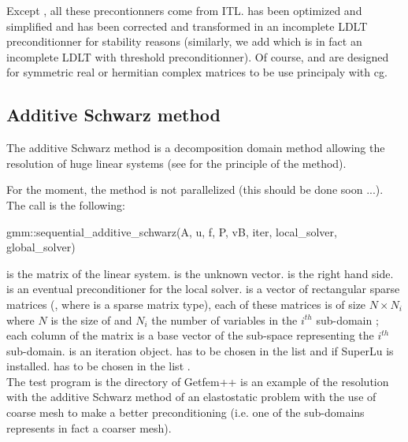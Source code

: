 \documentclass[11pt,a4paper]{article}
\begin{document}
Except , all these precontionners come from ITL.  has been optimized and simplified and  has been corrected and transformed in an incomplete LDLT preconditionner for stability reasons (similarly, we add  which is in fact an incomplete LDLT with threshold preconditionner). Of course,  and  are designed for symmetric real or hermitian complex matrices to be use principaly with cg.

\subsection{Additive Schwarz method}
The additive Schwarz method is a decomposition domain method allowing the resolution of huge linear systems (see \cite{SCHADD} for the principle of the method).

For the moment, the method is not parallelized (this should be done soon ...). The call is the following: 

\begin{cppcode}
 gmm::sequential_additive_schwarz(A, u, f, P, vB, iter, local_solver, global_solver)
\end{cppcode}                           
 is the matrix of the linear system.  is the unknown vector.  is the right hand side.  is an eventual preconditioner for the local solver.  is a vector of rectangular sparse matrices (, where  is a sparse matrix type), each of these matrices is of size $N \times N_i $ where $N$ is the size of  and $N_i$ the number of variables in the $i^{th}$ sub-domain ; each column of the matrix is a base vector of the sub-space representing the $i^{th}$ sub-domain.  is an iteration object.  has to be chosen in the list  and   if SuperLu is installed.  has to be chosen in the list .\\

The test program  is the directory  of Getfem++ is an example of the resolution with the additive Schwarz method of an elastostatic problem with the use of coarse mesh to make a better preconditioning (i.e. one of the sub-domains represents in fact a coarser mesh).\\
\end{document}
